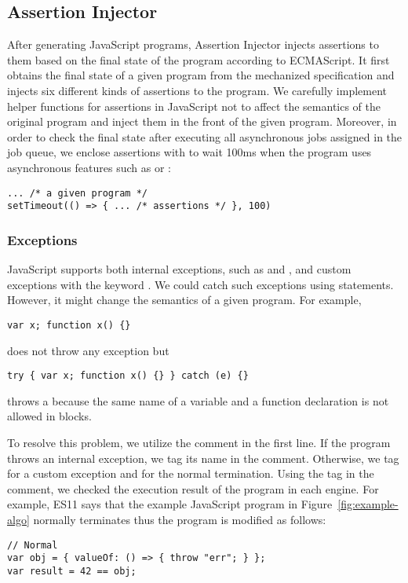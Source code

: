 \subsection{Assertion Injector}

After generating JavaScript programs, \textsf{Assertion Injector} injects
assertions to them based on the final state of the program according to
ECMAScript.  It first obtains the final state of a given program from the
mechanized specification and injects six different kinds of assertions to the
program.  We carefully implement helper functions for assertions in JavaScript
not to affect the semantics of the original program and inject them in the front
of the given program.  Moreover, in order to check the final state after
executing all asynchronous jobs assigned in the job queue, we enclose assertions
with  to wait 100ms when the program uses asynchronous features
such as  or :
\begin{lstlisting}[style=myJSstyle]
... /* a given program */
setTimeout(() => { ... /* assertions */ }, 100)
\end{lstlisting}


\subsubsection{Exceptions}

JavaScript supports both internal exceptions, such as  and
, and custom exceptions with the keyword .  We could
catch such exceptions using  statements.  However, it might
change the semantics of a given program.  For example,
\begin{lstlisting}[style=myJSstyle]
var x; function x() {}
\end{lstlisting}
does not throw any exception but
\begin{lstlisting}[style=myJSstyle]
try { var x; function x() {} } catch (e) {}
\end{lstlisting}
throws a  because the same name of a variable and a function
declaration is not allowed in  blocks.

To resolve this problem, we utilize the comment in the first line.  If the
program throws an internal exception, we tag its name in the comment.
Otherwise, we tag  for a custom exception and  for
the normal termination.  Using the tag in the comment, we checked the execution
result of the program in each engine.  For example, ES11 says that the example
JavaScript program in Figure~\ref{fig:example-algo} normally terminates thus the
program is modified as follows:
\begin{lstlisting}[style=myJSstyle]
// Normal
var obj = { valueOf: () => { throw "err"; } };
var result = 42 == obj;
\end{lstlisting}


